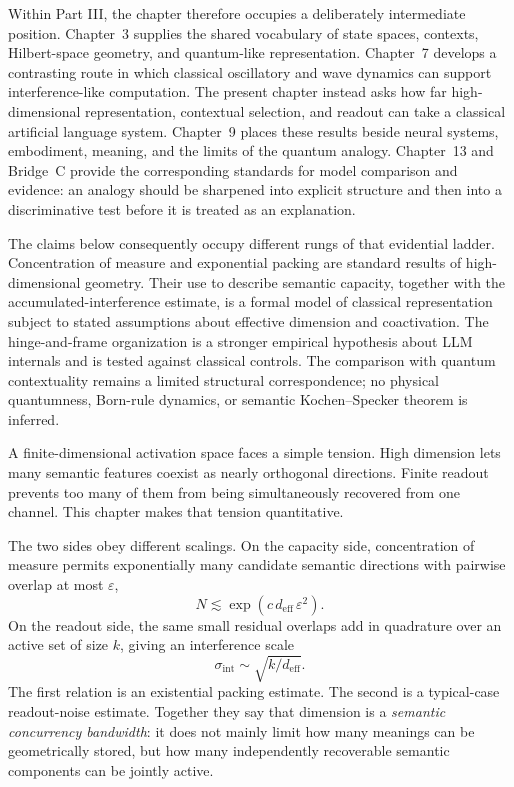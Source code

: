 \documentclass[
  aps,
  reprint,
  superscriptaddress,
  floatfix,
  nofootinbib,
  longbibliography
]{revtex4-2}
\newcommand{\deff}{d_{\mathrm{eff}}}
\newcommand{\sint}{\sigma_{\mathrm{int}}}
\begin{document}
Within Part III, the chapter therefore occupies a deliberately intermediate
position.  Chapter~3 supplies the shared vocabulary of state spaces,
contexts, Hilbert-space geometry, and quantum-like representation.
Chapter~7 develops a contrasting route in which classical oscillatory and
wave dynamics can support interference-like computation.  The present
chapter instead asks how far high-dimensional representation, contextual
selection, and readout can take a classical artificial language system.
Chapter~9 places these results beside neural systems, embodiment, meaning,
and the limits of the quantum analogy.  Chapter~13 and Bridge~C provide the
corresponding standards for model comparison and evidence: an analogy should
be sharpened into explicit structure and then into a discriminative test
before it is treated as an explanation.

The claims below consequently occupy different rungs of that evidential
ladder.  Concentration of measure and exponential packing are standard
results of high-dimensional geometry.  Their use to describe semantic
capacity, together with the accumulated-interference estimate, is a formal
model of classical representation subject to stated assumptions about
effective dimension and coactivation.  The hinge-and-frame organization is
a stronger empirical hypothesis about LLM internals and is tested against
classical controls.  The comparison with quantum contextuality remains a
limited structural correspondence; no physical quantumness, Born-rule
dynamics, or semantic Kochen--Specker theorem is inferred.

A finite-dimensional activation space faces a simple tension. High
dimension lets many semantic features coexist as nearly orthogonal
directions. Finite readout prevents too many of them from being
simultaneously recovered from one channel. This chapter makes that
tension quantitative.

The two sides obey different scalings. On the capacity side,
concentration of measure permits exponentially many candidate semantic
directions with pairwise overlap at most $\varepsilon$,
%
\begin{equation}
\label{eq:intro-capacity}
N\lesssim \exp(c\,\deff\,\varepsilon^{2}).
\end{equation}
%
On the readout side, the same small residual overlaps add in quadrature
over an active set of size $k$, giving an interference scale
%
\begin{equation}
\label{eq:intro-readout}
\sint\sim\sqrt{k/\deff}.
\end{equation}
%
The first relation is an existential packing estimate. The second is a
typical-case readout-noise estimate. Together they say that dimension
is a \emph{semantic concurrency bandwidth}: it does not mainly limit how
many meanings can be geometrically stored, but how many independently
recoverable semantic components can be jointly active.
\end{document}
